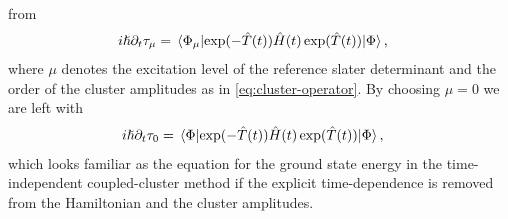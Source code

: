             from
            \begin{align}
                i\hslash \partial_t\clustamp_{\mu}
                &=
                \mel*{\slat_{\mu}}{
                    \exponential(-\clust(t))
                    \hamil(t)
                    \exponential(\clust(t))
                }{\slat},
            \end{align}
            where $\mu$ denotes the excitation level of the reference slater
            determinant and the order of the cluster amplitudes as in
            \autoref{eq:cluster-operator}.
            By choosing $\mu = 0$ we are left with
            \begin{align}
                i\hslash \partial_t\clustamp_{0}
                &=
                \mel*{\slat}{
                    \exponential(-\clust(t))
                    \hamil(t)
                    \exponential(\clust(t))
                }{\slat},
            \end{align}
            which looks familiar as the equation for the ground state
            energy in the time-independent coupled-cluster method if the
            explicit time-dependence is removed from the Hamiltonian and the
            cluster amplitudes.
